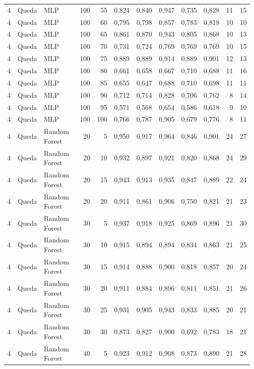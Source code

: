 \begin{longtable}{@{}rllrrrrrrrrr@{}}
4 & Queda & MLP & 100 & 55 & 0,824 & 0,840 & 0,947 & 0,735 & 0,828 & 11 & 15 \\
4 & Queda & MLP & 100 & 60 & 0,795 & 0,798 & 0,857 & 0,783 & 0,818 & 10 & 10 \\
4 & Queda & MLP & 100 & 65 & 0,861 & 0,870 & 0,943 & 0,805 & 0,868 & 10 & 13 \\
4 & Queda & MLP & 100 & 70 & 0,731 & 0,724 & 0,769 & 0,769 & 0,769 & 10 & 15 \\
4 & Queda & MLP & 100 & 75 & 0,889 & 0,889 & 0,914 & 0,889 & 0,901 & 12 & 13 \\
4 & Queda & MLP & 100 & 80 & 0,661 & 0,658 & 0,667 & 0,710 & 0,688 & 11 & 16 \\
4 & Queda & MLP & 100 & 85 & 0,655 & 0,647 & 0,688 & 0,710 & 0,698 & 11 & 11 \\
4 & Queda & MLP & 100 & 90 & 0,712 & 0,714 & 0,828 & 0,706 & 0,762 & 8 & 14 \\
4 & Queda & MLP & 100 & 95 & 0,571 & 0,568 & 0,654 & 0,586 & 0,618 & 9 & 10 \\
4 & Queda & MLP & 100 & 100 & 0,766 & 0,787 & 0,905 & 0,679 & 0,776 & 8 & 11 \\
4 & Queda & Random Forest & 20 & 5 & 0,950 & 0,917 & 0,964 & 0,846 & 0,901 & 24 & 27 \\
4 & Queda & Random Forest & 20 & 10 & 0,932 & 0,897 & 0,921 & 0,820 & 0,868 & 24 & 29 \\
4 & Queda & Random Forest & 20 & 15 & 0,943 & 0,913 & 0,935 & 0,847 & 0,889 & 22 & 24 \\
4 & Queda & Random Forest & 20 & 20 & 0,911 & 0,861 & 0,906 & 0,750 & 0,821 & 21 & 23 \\
4 & Queda & Random Forest & 30 & 5 & 0,937 & 0,918 & 0,925 & 0,869 & 0,896 & 21 & 30 \\
4 & Queda & Random Forest & 30 & 10 & 0,915 & 0,894 & 0,894 & 0,834 & 0,863 & 21 & 25 \\
4 & Queda & Random Forest & 30 & 15 & 0,914 & 0,888 & 0,900 & 0,818 & 0,857 & 20 & 24 \\
4 & Queda & Random Forest & 30 & 20 & 0,911 & 0,884 & 0,896 & 0,811 & 0,851 & 21 & 26 \\
4 & Queda & Random Forest & 30 & 25 & 0,931 & 0,905 & 0,943 & 0,833 & 0,885 & 20 & 21 \\
4 & Queda & Random Forest & 30 & 30 & 0,873 & 0,827 & 0,900 & 0,692 & 0,783 & 18 & 21 \\
4 & Queda & Random Forest & 40 & 5 & 0,923 & 0,912 & 0,908 & 0,873 & 0,890 & 21 & 28 \\

\end{longtable}
